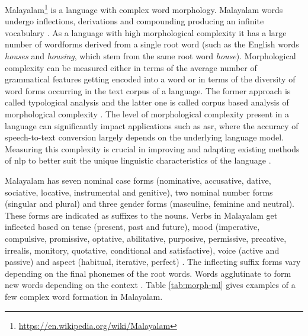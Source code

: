 Malayalam\footnote{\url{https://en.wikipedia.org/wiki/Malayalam}} is a language
with complex word morphology. Malayalam words undergo inflections, derivations
and compounding producing an infinite vocabulary \cite{thottingal2019finite}.
As a language with high morphological complexity it has a large number of
wordforms derived from a single root word (such as the English words
\textit{houses} and \textit{housing}, which stem from the same root word
\textit{house}). Morphological complexity can be measured either in terms of
the average number of grammatical features getting encoded into a word or in
terms of the diversity of word forms occurring in the text corpus of a
language. The former approach is called typological analysis and the latter one
is called corpus based analysis of morphological complexity
\cite{bentz2016comparison}. The level of morphological complexity present in a language can significantly impact applications such as \gls{asr}, where the accuracy of speech-to-text conversion largely depends on the underlying language model. Measuring this complexity is crucial in improving and adapting existing methods of \gls{nlp} to better suit the unique linguistic characteristics of the language \cite{gutierrez2018comparing}.





Malayalam has seven nominal case forms (nominative, accusative, dative,
sociative, locative, instrumental and genitive), two nominal number forms
(singular and plural) and three gender forms (masculine, feminine and neutral).
These forms are indicated as suffixes to the nouns. Verbs in Malayalam get
inflected based on tense (present, past and future), mood (imperative,
compulsive, promissive, optative, abilitative, purposive, permissive,
precative, irrealis, monitory, quotative, conditional and satisfactive), voice
(active and passive) and aspect (habitual, iterative, perfect)
\cite{nair2012grammar,thottingal2019finite}. The inflecting suffix forms vary
depending on the final phonemes of the root words. Words agglutinate to form
new words depending on the context \cite{asher1997malayalam}. Table
\ref{tab:morph-ml} gives examples of a few complex word formation in Malayalam.

